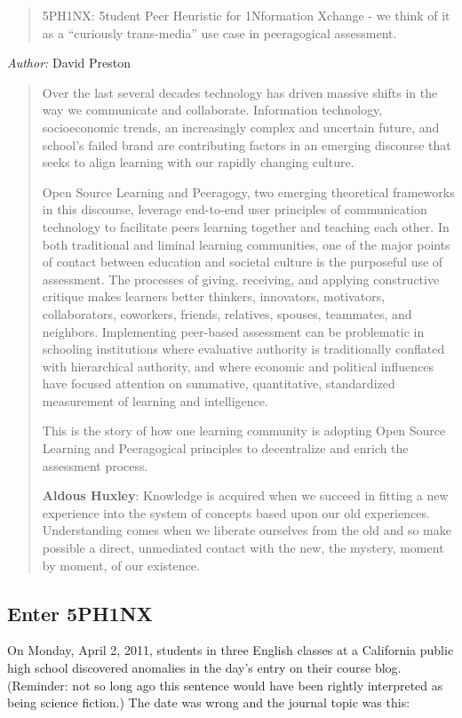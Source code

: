 \begin{quote}
5PH1NX: 5tudent Peer Heuristic for 1Nformation Xchange - we think of it
as a ``curiously trans-media'' use case in peeragogical assessment.
\end{quote}
\emph{Author:} David Preston

\begin{quote}
Over the last several decades technology has driven massive shifts in
the way we communicate and collaborate. Information technology,
socioeconomic trends, an increasingly complex and uncertain future, and
school's failed brand are contributing factors in an emerging discourse
that seeks to align learning with our rapidly changing culture.

Open Source Learning and Peeragogy, two emerging theoretical frameworks
in this discourse, leverage end-to-end user principles of communication
technology to facilitate peers learning together and teaching each
other. In both traditional and liminal learning communities, one of the
major points of contact between education and societal culture is the
purposeful use of assessment. The processes of giving, receiving, and
applying constructive critique makes learners better thinkers,
innovators, motivators, collaborators, coworkers, friends, relatives,
spouses, teammates, and neighbors. Implementing peer-based assessment
can be problematic in schooling institutions where evaluative authority
is traditionally conflated with hierarchical authority, and where
economic and political influences have focused attention on summative,
quantitative, standardized measurement of learning and intelligence.

This is the story of how one learning community is adopting Open Source
Learning and Peeragogical principles to decentralize and enrich the
assessment process.

\textbf{Aldous Huxley}: Knowledge is acquired when we succeed in fitting
a new experience into the system of concepts based upon our old
experiences. Understanding comes when we liberate ourselves from the old
and so make possible a direct, unmediated contact with the new, the
mystery, moment by moment, of our existence.

\end{quote}
\subsection{Enter 5PH1NX}

On Monday, April 2, 2011, students in three English classes at a
California public high school discovered anomalies in the day's entry on
their course blog. (Reminder: not so long ago this sentence would have
been rightly interpreted as being science fiction.) The date was wrong
and the journal topic was this:

